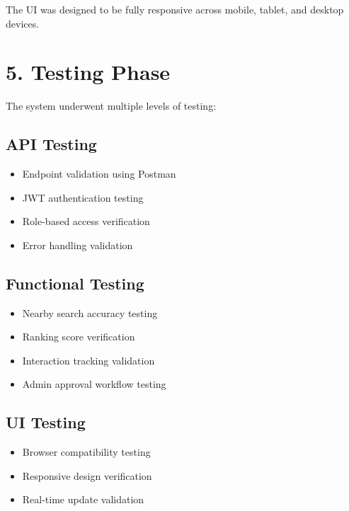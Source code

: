 \documentclass[12pt,a4paper]{report}
\begin{document}
The UI was designed to be fully responsive across mobile, tablet, and desktop devices.

\section{5. Testing Phase}

The system underwent multiple levels of testing:

\subsection*{API Testing}

\begin{itemize}

\item Endpoint validation using Postman

\item JWT authentication testing

\item Role-based access verification

\item Error handling validation

\end{itemize}

\subsection*{Functional Testing}

\begin{itemize}

\item Nearby search accuracy testing

\item Ranking score verification

\item Interaction tracking validation

\item Admin approval workflow testing

\end{itemize}

\subsection*{UI Testing}

\begin{itemize}

\item Browser compatibility testing

\item Responsive design verification

\item Real-time update validation

\end{itemize}
\end{document}
